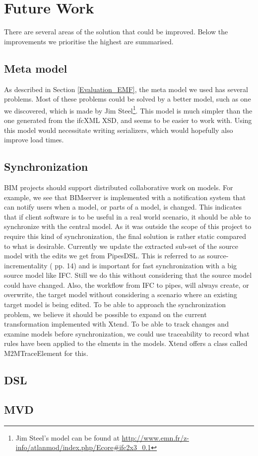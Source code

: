\section{Future Work}
\label{sec:future_work}
There are several areas of the solution that could be improved. Below the improvements we prioritise the highest are summarised.
\subsection{Meta model}
As described in Section \ref{Evaluation_EMF}, the meta model we used has several problems. Most of these problems could be solved by a better model, such as one we discovered, which is made by Jim Steel\footnote{Jim Steel's model can be found at \url{http://www.emn.fr/z-info/atlanmod/index.php/Ecore#ifc2x3_0.1}}. This model is much simpler than the one generated from the ifcXML XSD, and seems to be easier to work with. Using this model would necessitate writing serializers, which would hopefully also improve load times.
\subsection{Synchronization}
    BIM projects should support distributed collaborative work on models. For example, we see that BIMserver is implemented with a notification system that can notify users when a model, or parts of a model, is changed. This indicates that if client software is to be useful in a real world scenario, it should be able to synchronize with the central model. As it was outside the scope of this project to require this kind of synchronization, the final solution is rather static compared to what is desirable. Currently we update the extracted sub-set of the source model with the edits we get from PipesDSL. This is referred to as source-incrementality (\cite{czarnecki06} pp. 14) and is important for fast synchronization with a big source model like IFC. Still we do this without considering that the source model could have changed. Also, the workflow from IFC to pipes, will always create, or overwrite, the target model without considering a scenario where an existing target model is being edited. To be able to approach the synchronization problem, we believe it should be possible to expand on the current transformation implemented with Xtend. To be able to track changes and examine models before synchronization, we could use traceability to record what rules have been applied to the elments in the models. Xtend offers a class called M2MTraceElement\cite{xtendtrace} for this.

\subsection{DSL}
\subsection{MVD}

